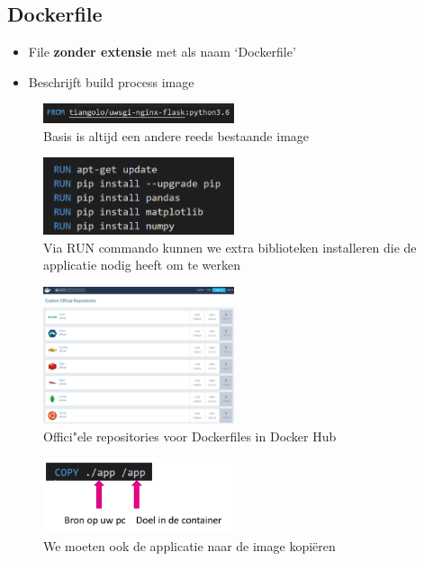 \documentclass{article}
\newcommand{\bold}[1]{\textbf{#1}}
\begin{document}
\subsection{Dockerfile}

\begin{itemize}
    \item File \bold{zonder extensie} met als naam `Dockerfile'
    \item Beschrijft build process image
\end{itemize}

\begin{figure}[H]
    \centering
    \includegraphics[width=0.5\textwidth]{dockerfile-1.png}
    \caption{Basis is altijd een andere reeds bestaande image}
\end{figure}

\begin{figure}[H]
    \centering
    \includegraphics[width=0.5\textwidth]{dockerfile-2.png}
    \caption{Via RUN commando kunnen we extra biblioteken installeren die de applicatie nodig heeft om te werken}
\end{figure}

\begin{figure}[H]
    \centering
    \includegraphics[width=0.5\textwidth]{dockerfile-3.png}
    \caption{Offici"ele repositories voor Dockerfiles in Docker Hub}
\end{figure}

\begin{figure}[H]
    \centering
    \includegraphics[width=0.5\textwidth]{dockerfile-4.png}
    \caption{We moeten ook de applicatie naar de image kopiëren}
\end{figure}
\end{document}

